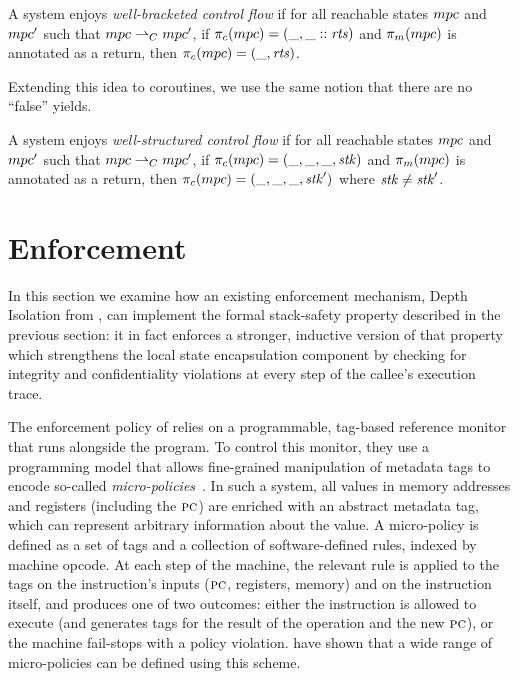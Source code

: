 \documentclass[acmsmall,review,anonymous]{acmart}\settopmatter{printfolios=true,printccs=false,printacmref=false}
\begin{document}
 A system enjoys {\em well-bracketed control flow} if for all
reachable states \(mpc\) and \(mpc'\) such that
\(mpc \overset{}{\rightharpoonup}_C mpc'\), if
\(\pi_c(mpc) = (\_, \_::\mathit{rts})\) and \(\pi_m(mpc)\)
is annotated as a return, then \(\pi_c(mpc) = (\_, \mathit{rts})\).

Extending this idea to coroutines, we use the same notion that there are
no ``false'' yields.

 A system enjoys {\em well-structured control flow} if for all
reachable states \(mpc\) and \(mpc'\) such that
\(mpc \overset{}{\rightharpoonup}_C mpc'\), if
\(\pi_c(mpc) = (\_,\_,\_,\mathit{stk})\) and \(\pi_m(mpc)\)
is annotated as a return, then \(\pi_c(mpc) = (\_,\_,\_,\mathit{stk}')\)
where \(\mathit{stk} \not = \mathit{stk}'\).

\section{Enforcement}
\label{sec:enforcement}

In this section we examine how an existing enforcement mechanism,
Depth Isolation from \citet{DBLP:conf/sp/RoesslerD18}, can implement
the formal stack-safety property described in the previous section: it in
fact enforces a stronger, inductive version of that property which strengthens the
local state encapsulation component by checking for integrity and
confidentiality violations at every step of the callee's execution trace. 

%
The enforcement policy of \citeauthor{DBLP:conf/sp/RoesslerD18} relies
on a programmable, tag-based reference monitor that runs alongside the
program.  To control this monitor, they use a programming model that
allows fine-grained manipulation of metadata tags to encode so-called
\emph{micro-policies}~\citep{pump_oakland2015}.
In such a system, all values in
memory addresses and registers (including the $\textsc{pc}$)
are enriched with an abstract metadata tag, which can represent
arbitrary information about the value. A micro-policy is defined as a set of tags and a
collection of software-defined rules, indexed by machine opcode.
At each step of the machine, the relevant rule is applied to the tags on
the instruction's inputs ($\textsc{pc}$, registers, memory) and on the instruction itself, and produces
one of two outcomes: either the instruction is allowed to execute (and generates
tags for the result of the operation and the new $\textsc{pc}$), or the machine
fail-stops with a policy violation.
\citeauthor{pump_oakland2015} have shown that a wide range of micro-policies can
be defined using this scheme.
\end{document}
